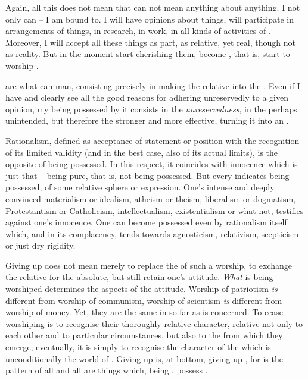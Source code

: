 Again, all this does not mean that  can not mean anything about anything.
I not only can -- I am bound to.  I will have opinions about things,  will
participate in arrangements of things, in research, in work, in all kinds of
activities of . Moreover, I will accept all these things as
 part, as relative, yet  real, though not as 
reality.  But in the moment  start cherishing them,  become
, that is,  start to worship .

\pa {} are what can  man, 
consisting precisely in making the relative into the .
Even if I have and clearly see all the good reasons for
adhering unreservedly to a given opinion, my being possessed by
it consists in the {\em unreservedness}, in the perhaps unintended,
but therefore the stronger and more effective, turning it into an
.

Rationalism, defined as acceptance of  statement or position with the
recognition of its limited validity (and in the best case, also of its actual
limits), is the opposite of being possessed.  In this respect, it coincides with
innocence which is just that -- being pure, that is, not being possessed.
But every  indicates being possessed,  of some
relative sphere 
or expression.  One's intense and deeply convinced materialism or idealism,
atheism or theism, liberalism or dogmatism, Protestantism or Catholicism,
intellectualism, existentialism or what not, testifies against one's innocence.
One can become possessed even by rationalism itself which,  and
 in its  complacency, tends towards 
agnosticism, relativism, scepticism or just dry rigidity.


\pa Giving up  does not mean merely to replace the  of such a
worship, to exchange the relative for the absolute, but still retain one's
attitude.  {\em What} is being worshiped determines the  aspects of the
attitude.  Worship of patriotism {\em is} different from worship of communism,
worship of scientism {\em is} different from worship of money.  Yet, they are
the same in so far as  is concerned.  To cease worshiping 
is to recognise their thoroughly relative character, relative not only to each
other and to particular circumstances, but also to the  from
which they emerge; eventually, it is simply to recognise the 
character of the  which is unconditionally  the world of
. Giving up  is, at bottom, giving up , for
 is the pattern of all  and all  are
things which, being , possess .  

